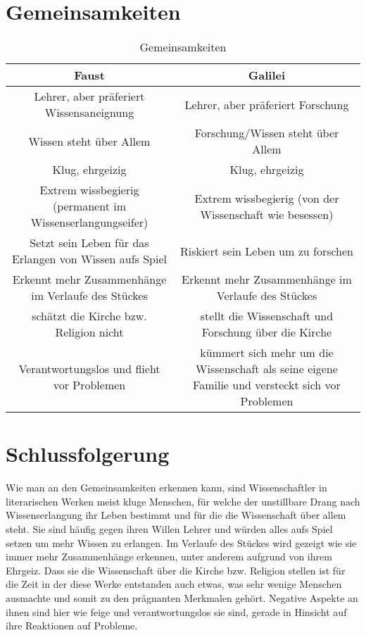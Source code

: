 \documentclass[12pt]{scrreprt}
\begin{document}
\section{Gemeinsamkeiten}
	\label{sec:gemeinsamkeiten}
	\begin{table}[!htb]
		\centering
		\caption[Gemeinsamkeiten]{Gemeinsamkeiten\footnotemark}
		\begin{tabulary}{\textwidth}{|C|C|}
			\hline
			\textbf{Faust} & \textbf{Galilei} \\
			\hline
			Lehrer, aber präferiert Wissensaneignung & Lehrer, aber präferiert Forschung \\
			\hline
			Wissen steht über Allem & Forschung/Wissen steht über Allem \\
			\hline
			Klug, ehrgeizig & Klug, ehrgeizig  \\
			\hline
			Extrem wissbegierig (permanent im Wissenserlangungseifer) & Extrem wissbegierig (von der Wissenschaft wie besessen) \\
			\hline
			Setzt sein Leben für das Erlangen von Wissen aufs Spiel & Riskiert sein Leben um zu forschen  \\
			\hline
			Erkennt mehr Zusammenhänge im Verlaufe des Stückes & Erkennt mehr Zusammenhänge im Verlaufe des Stückes  \\
			\hline
			schätzt die Kirche bzw. Religion nicht & stellt die Wissenschaft und Forschung über die Kirche  \\
			\hline
			Verantwortungslos und flieht vor Problemen & kümmert sich mehr um die Wissenschaft als seine eigene Familie und versteckt sich vor Problemen \\
			\hline
		\end{tabulary}
		\label{tab:gemeinsamkeiten}
	\end{table}
\section{Schlussfolgerung}
	\label{sec:schlussfolgerung}
Wie man an den Gemeinsamkeiten erkennen kann, sind Wissenschaftler in literarischen Werken meist kluge Menschen, für welche der unstillbare Drang nach Wissenserlangung ihr Leben bestimmt und für die die Wissenschaft über allem steht.
Sie sind häufig gegen ihren Willen Lehrer und würden alles aufs Spiel setzen um mehr Wissen zu erlangen.
Im Verlaufe des Stückes wird gezeigt wie sie immer mehr Zusammenhänge erkennen, unter anderem aufgrund von ihrem Ehrgeiz.
Dass sie die Wissenschaft über die Kirche bzw. Religion stellen ist für die Zeit in der diese Werke entstanden auch etwas, was sehr wenige Menschen ausmachte und somit zu den prägnanten Merkmalen gehört.
Negative Aspekte an ihnen sind hier wie feige und verantwortungslos sie sind, gerade in Hinsicht auf ihre Reaktionen auf Probleme.
\end{document}
